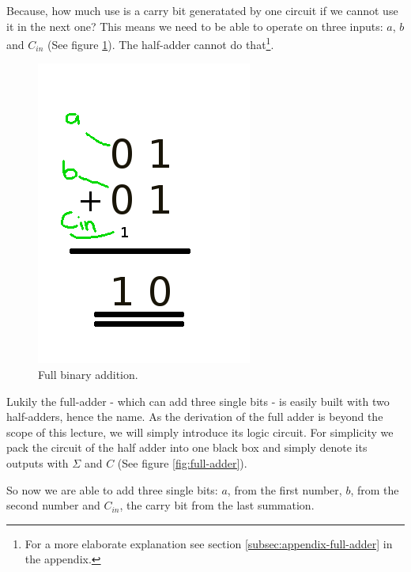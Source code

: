 \documentclass[10pt,a4paper]{article}
\begin{document}
	Because, how much use is a carry bit generatated by one circuit if we cannot use it in the next one? This means we need to be able to operate on three inputs: $a$, $b$ and $C_{in}$ (See figure \ref{fig:full-binary-addition}). The half-adder cannot do that\footnote{For a more elaborate explanation see section \ref{subsec:appendix-full-adder} in the appendix.}.
	
	\begin{figure}[H]
		\centering		  
		\includegraphics[scale=0.3]{full_binary_addition.png}
		\caption{Full binary addition.}
		\label{fig:full-binary-addition}
	\end{figure}
	
	
	Lukily the full-adder - which can add three single bits - is easily built with two half-adders, hence the name. As the derivation of the full adder is beyond the scope of this lecture, we will simply introduce its logic circuit. For simplicity we pack the circuit of the half adder into one black box and simply denote its outputs with $\Sigma$ and $C$ (See figure \ref{fig:full-adder}).
	
	So now we are able to add three single bits: $a$, from the first number, $b$, from the second number and $C_{in}$, the carry bit from the last summation. 
	
\end{document}
